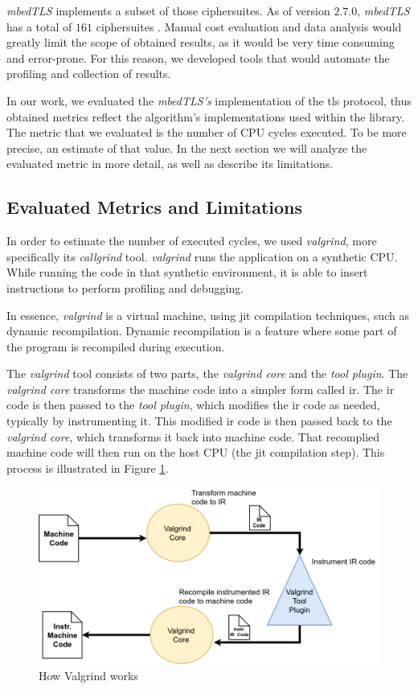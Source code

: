 \documentclass{llncs}
\begin{document}
\textit{mbedTLS} implements a subset of those ciphersuites. As of version $2.7.0$, \textit{mbedTLS}
has a total of $161$ ciphersuites \cite{mbedTLS_ciphers_list:online}. Manual cost evaluation and
data analysis would greatly limit the scope of obtained results, as it would be very time consuming
and error-prone. For this reason, we developed tools that would automate the profiling and collection
of results.

In our work, we evaluated the \textit{mbedTLS's} implementation of the \gls{tls} protocol, thus obtained
metrics reflect the algorithm's implementations used within the library. The metric that we evaluated is the number
of CPU cycles executed. To be more precise, an estimate of that value. In the next section we will analyze the
evaluated metric in more detail, as well as describe its limitations.


\subsection{Evaluated Metrics and Limitations}

In order to estimate the number of executed cycles, we used \textit{valgrind}, more specifically
    its \textit{callgrind} tool. \textit{valgrind} runs the application on a synthetic CPU.
While running the code in that synthetic environment, it is able to insert instructions to perform
profiling and debugging.

In essence, \textit{valgrind} is a virtual machine, using \gls{jit}
compilation techniques, such as dynamic recompilation. Dynamic recompilation is a
feature where some part of the program is recompiled during execution.

The \textit{valgrind} tool consists of two parts, the \textit{valgrind core} and the \textit{tool
plugin}. The \textit{valgrind core} transforms the machine code into a simpler form called
\gls{ir}. The \gls{ir} code is then passed to the \textit{tool plugin}, which modifies the
\gls{ir} code as needed, typically by instrumenting it. This modified \gls{ir} code is then passed back to the
\textit{valgrind core}, which transforms it back into machine code. That recomplied machine code  will then run on the
host CPU (the \gls{jit} compilation step). This process is illustrated in Figure \ref{fig:how_valgrind_works}.

\begin{figure}
  \centering
  \includegraphics[width=1.0\textwidth]{img/how_valgrind_works.png}
  \centering \caption{\label{fig:how_valgrind_works} How Valgrind works}
\end{figure}
\end{document}
